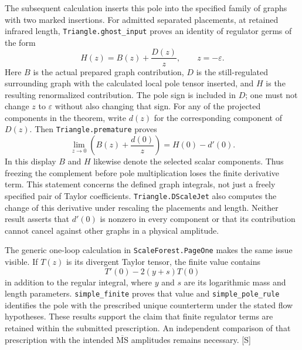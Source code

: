 \documentclass[11pt]{article}
\newcommand{\MS}{\overline{\mathrm{MS}}}
\newcommand{\code}[1]{{\small\nolinkurl{#1}}}
\newcommand{\src}[1]{\textsf{[#1]}}
\begin{document}
The subsequent calculation inserts this pole into the specified family
of graphs with two marked insertions. For admitted separated placements,
at retained infrared length, \code{Triangle.ghost_input} proves an
identity of regulator germs of the form
\begin{equation}\label{eq:actual-pole-complement}
 H(z)=B(z)+\frac{D(z)}{z},\qquad z=-\varepsilon.
\end{equation}
Here $B$ is the actual prepared graph contribution, $D$ is the
still-regulated surrounding graph with the calculated local pole tensor
inserted, and $H$ is the resulting renormalized contribution.
The pole sign is included in $D$; one must not change $z$ to
$\varepsilon$ without also changing that sign.
For any of the projected components in the theorem, write $d(z)$
for the corresponding component of $D(z)$. Then
\code{Triangle.premature} proves
\begin{equation}\label{eq:premature-pole}
 \lim_{z\to0}\left(B(z)+\frac{d(0)}{z}\right)
       =H(0)-d'(0).
\end{equation}
In this display $B$ and $H$ likewise denote the selected scalar
components. Thus freezing the complement before pole multiplication
loses the finite derivative term. This statement concerns the defined
graph integrals, not just a freely specified pair of Taylor coefficients.
\code{Triangle.DScaleJet} also computes the change of this derivative
under rescaling the placements and length. Neither result asserts that
$d'(0)$ is nonzero in every component or that its contribution cannot
cancel against other graphs in a physical amplitude.

The generic one-loop calculation in \code{ScaleForest.PageOne} makes
the same issue visible. If $T(z)$ is its divergent Taylor tensor, the
finite value contains
\[
 T'(0)-2(y+s)T(0)
\]
in addition to the regular integral, where $y$ and $s$ are its logarithmic
mass and length parameters. \code{simple_finite} proves that value and
\code{simple_pole_rule} identifies the pole with the prescribed unique
counterterm under the stated flow hypotheses. These results support the
claim that finite regulator terms are retained within the submitted
prescription. An independent comparison of that prescription with the
intended $\MS$ amplitudes remains necessary. \src{S}
\end{document}

